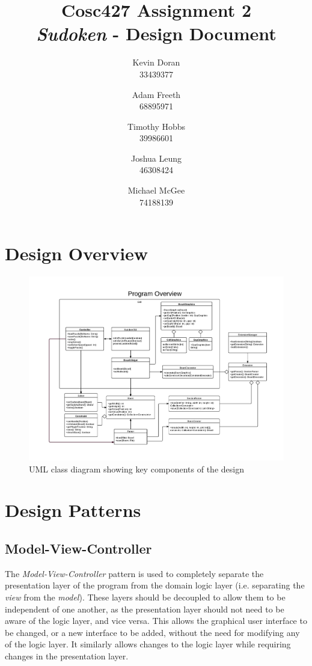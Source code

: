 \documentclass[a4paper, 11pt]{article}
\title{\textbf{Cosc427 Assignment 2} \\ {\textit{Sudoken} - Design Document}}
\author{
	Kevin Doran    \\ 33439377 \and
	Adam Freeth    \\ 68895971 \and
	Timothy Hobbs  \\ 39986601 \and
	Joshua Leung   \\ 46308424 \and
	Michael McGee  \\ 74188139
}
\begin{document}
\maketitle


\section{Design Overview}
\begin{figure}[h]
\includegraphics[width=\textwidth]{FrameworkOverview.pdf}
\caption{UML class diagram showing key components of the design}
\end{figure}

\section{Design Patterns}

\subsection{Model-View-Controller}

The \textit{Model-View-Controller} pattern is used to completely separate the presentation layer of the program from the domain logic layer (i.e. separating the \textit{view} from the \textit{model}). These layers should be decoupled to allow them to be independent of one another, as the presentation layer should not need to be aware of the logic layer, and vice versa. This allows the graphical user interface to be changed, or a new interface to be added, without the need for modifying any of the logic layer. It similarly allows changes to the logic layer while requiring changes in the presentation layer.
\end{document}
